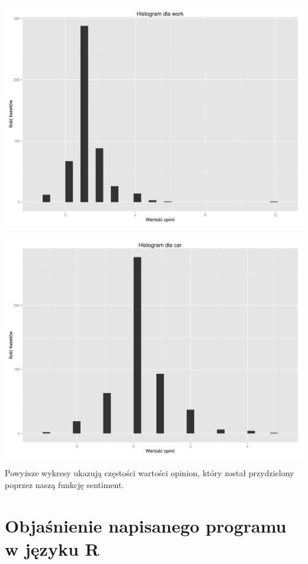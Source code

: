 \documentclass[12pt,a4paper]{report}
\begin{document}
\begin{center}
\includegraphics[scale=0.35]{pictures/Histwork.png}
\end{center}

\begin{center}
\includegraphics[scale=0.35]{pictures/Histcar.png}
\end{center}

Powyższe wykresy ukazują częstości wartości opinion, który został przydzielony poprzez naszą funkcję sentiment. 

\section[Objaśnienie napisanego programu w języku R] {Objaśnienie napisanego programu w języku R}
\end{document}
